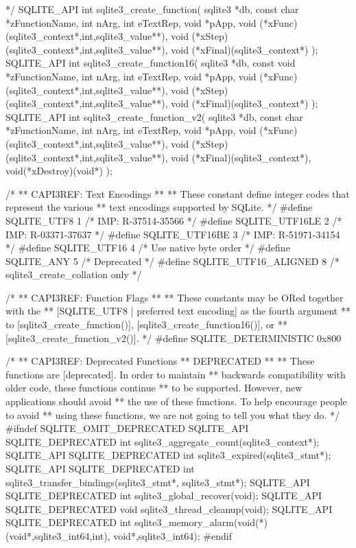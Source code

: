 \begin{Codex}[label=sqlite3.h,numbers=left]
{*/
SQLITE_API int sqlite3_create_function(
  sqlite3 *db,
  const char *zFunctionName,
  int nArg,
  int eTextRep,
  void *pApp,
  void (*xFunc)(sqlite3_context*,int,sqlite3_value**),
  void (*xStep)(sqlite3_context*,int,sqlite3_value**),
  void (*xFinal)(sqlite3_context*)
);
SQLITE_API int sqlite3_create_function16(
  sqlite3 *db,
  const void *zFunctionName,
  int nArg,
  int eTextRep,
  void *pApp,
  void (*xFunc)(sqlite3_context*,int,sqlite3_value**),
  void (*xStep)(sqlite3_context*,int,sqlite3_value**),
  void (*xFinal)(sqlite3_context*)
);
SQLITE_API int sqlite3_create_function_v2(
  sqlite3 *db,
  const char *zFunctionName,
  int nArg,
  int eTextRep,
  void *pApp,
  void (*xFunc)(sqlite3_context*,int,sqlite3_value**),
  void (*xStep)(sqlite3_context*,int,sqlite3_value**),
  void (*xFinal)(sqlite3_context*),
  void(*xDestroy)(void*)
);

/*
** CAPI3REF: Text Encodings
**
** These constant define integer codes that represent the various
** text encodings supported by SQLite.
*/
#define SQLITE_UTF8           1    /* IMP: R-37514-35566 */
#define SQLITE_UTF16LE        2    /* IMP: R-03371-37637 */
#define SQLITE_UTF16BE        3    /* IMP: R-51971-34154 */
#define SQLITE_UTF16          4    /* Use native byte order */
#define SQLITE_ANY            5    /* Deprecated */
#define SQLITE_UTF16_ALIGNED  8    /* sqlite3_create_collation only */

/*
** CAPI3REF: Function Flags
**
** These constants may be ORed together with the 
** [SQLITE_UTF8 | preferred text encoding] as the fourth argument
** to [sqlite3_create_function()], [sqlite3_create_function16()], or
** [sqlite3_create_function_v2()].
*/
#define SQLITE_DETERMINISTIC    0x800

/*
** CAPI3REF: Deprecated Functions
** DEPRECATED
**
** These functions are [deprecated].  In order to maintain
** backwards compatibility with older code, these functions continue 
** to be supported.  However, new applications should avoid
** the use of these functions.  To help encourage people to avoid
** using these functions, we are not going to tell you what they do.
*/
#ifndef SQLITE_OMIT_DEPRECATED
SQLITE_API SQLITE_DEPRECATED int sqlite3_aggregate_count(sqlite3_context*);
SQLITE_API SQLITE_DEPRECATED int sqlite3_expired(sqlite3_stmt*);
SQLITE_API SQLITE_DEPRECATED int sqlite3_transfer_bindings(sqlite3_stmt*, sqlite3_stmt*);
SQLITE_API SQLITE_DEPRECATED int sqlite3_global_recover(void);
SQLITE_API SQLITE_DEPRECATED void sqlite3_thread_cleanup(void);
SQLITE_API SQLITE_DEPRECATED int sqlite3_memory_alarm(void(*)(void*,sqlite3_int64,int),
                      void*,sqlite3_int64);
#endif

}
\end{Codex}
